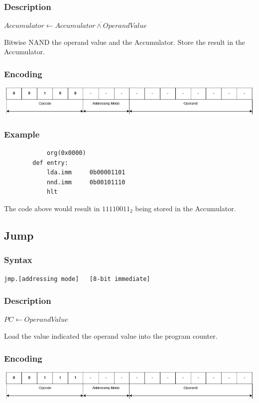     \subsubsection{Description}
    $Accumulator \leftarrow \overline{Accumulator \land OperandValue}$
    \par Bitwise NAND the operand value and the Accumulator.
    Store the result in the Accumulator.

    \subsubsection{Encoding}
    \begin{center}
        \includegraphics[scale=0.40]{img/Andromeda-NND.drawio}
    \end{center}


    \subsubsection{Example}
    \begin{verbatim}
            org(0x0000)
        def entry:
            lda.imm     0b00001101
            nnd.imm     0b00101110
            hlt
    \end{verbatim}
    \par The code above would result in $11110011_{2}$ being stored in the Accumulator.

\pagebreak
\subsection{Jump}\label{subsec:jmp}
    \subsubsection{Syntax}
    \begin{verbatim}jmp.[addressing mode]   [8-bit immediate]\end{verbatim}
    \subsubsection{Description}
    $PC \leftarrow OperandValue$
    \par Load the value indicated the operand value into the program counter.

    \subsubsection{Encoding}
    \begin{center}
        \includegraphics[scale=0.40]{img/Andromeda-JMP.drawio}
    \end{center}

